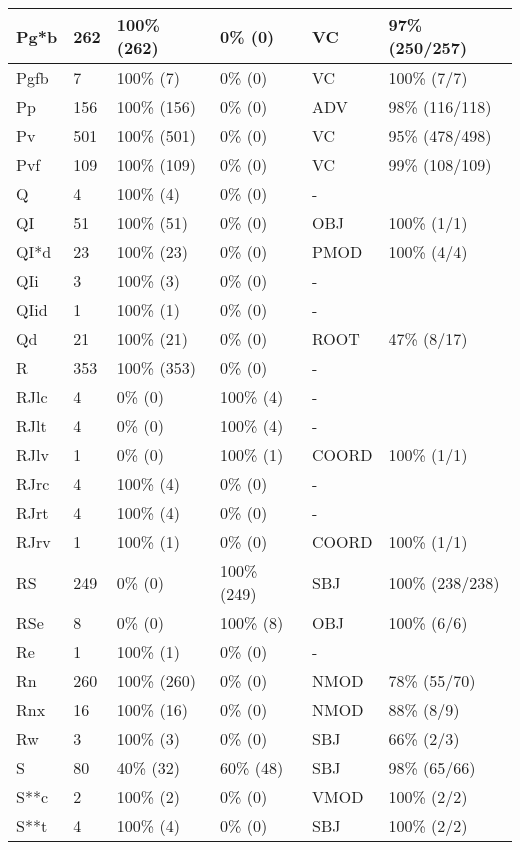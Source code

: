 \begin{figure*}
\begin{tabular}{|l|l|l|l||l|l|}
\hline
 Pg*b & 262 & 100\% (262) & 0\% (0) & VC & 97\% (250/257) \\ 
\hline
 Pgfb & 7 & 100\% (7) & 0\% (0) & VC & 100\% (7/7) \\ 
\hline
 Pp & 156 & 100\% (156) & 0\% (0) & ADV & 98\% (116/118) \\ 
\hline
 Pv & 501 & 100\% (501) & 0\% (0) & VC & 95\% (478/498) \\ 
\hline
 Pvf & 109 & 100\% (109) & 0\% (0) & VC & 99\% (108/109) \\ 
\hline
 Q & 4 & 100\% (4) & 0\% (0) & - &  \\ 
\hline
 QI & 51 & 100\% (51) & 0\% (0) & OBJ & 100\% (1/1) \\ 
\hline
 QI*d & 23 & 100\% (23) & 0\% (0) & PMOD & 100\% (4/4) \\ 
\hline
 QIi & 3 & 100\% (3) & 0\% (0) & - &  \\ 
\hline
 QIid & 1 & 100\% (1) & 0\% (0) & - &  \\ 
\hline
 Qd & 21 & 100\% (21) & 0\% (0) & ROOT & 47\% (8/17) \\ 
\hline
 R & 353 & 100\% (353) & 0\% (0) & - &  \\ 
\hline
 RJlc & 4 & 0\% (0) & 100\% (4) & - &  \\ 
\hline
 RJlt & 4 & 0\% (0) & 100\% (4) & - &  \\ 
\hline
 RJlv & 1 & 0\% (0) & 100\% (1) & COORD & 100\% (1/1) \\ 
\hline
 RJrc & 4 & 100\% (4) & 0\% (0) & - &  \\ 
\hline
 RJrt & 4 & 100\% (4) & 0\% (0) & - &  \\ 
\hline
 RJrv & 1 & 100\% (1) & 0\% (0) & COORD & 100\% (1/1) \\ 
\hline
 RS & 249 & 0\% (0) & 100\% (249) & SBJ & 100\% (238/238) \\ 
\hline
 RSe & 8 & 0\% (0) & 100\% (8) & OBJ & 100\% (6/6) \\ 
\hline
 Re & 1 & 100\% (1) & 0\% (0) & - &  \\ 
\hline
 Rn & 260 & 100\% (260) & 0\% (0) & NMOD & 78\% (55/70) \\ 
\hline
 Rnx & 16 & 100\% (16) & 0\% (0) & NMOD & 88\% (8/9) \\ 
\hline
 Rw & 3 & 100\% (3) & 0\% (0) & SBJ & 66\% (2/3) \\ 
\hline
 S & 80 & 40\% (32) & 60\% (48) & SBJ & 98\% (65/66) \\ 
\hline
 S**c & 2 & 100\% (2) & 0\% (0) & VMOD & 100\% (2/2) \\ 
\hline
 S**t & 4 & 100\% (4) & 0\% (0) & SBJ & 100\% (2/2) \\ 
\hline
\end{tabular}
\end{figure*}
